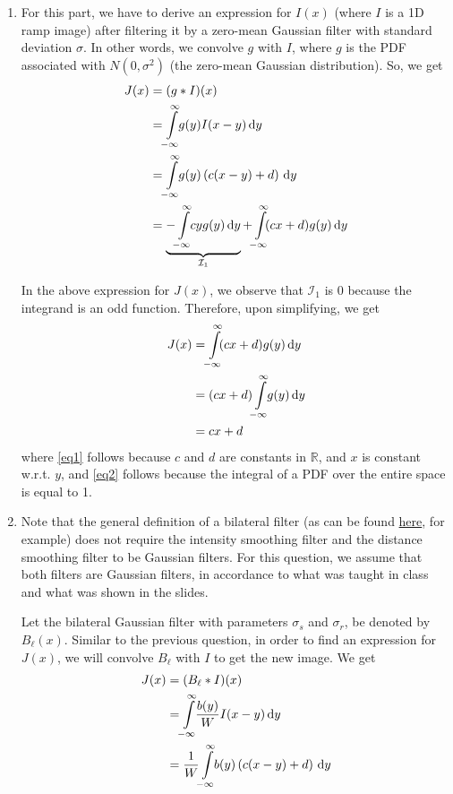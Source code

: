 \documentclass[a4paper]{article}
\newcommand{\R}{\mathbb{R}}
\begin{document}
\begin{enumerate}
\item For this part, we have to derive an expression for $I(x)$ (where $I$ is a 1D ramp image) after filtering it by a zero-mean Gaussian filter with standard deviation $\sigma$. In other words, we convolve $g$ with $I$, where $g$ is the PDF associated with $N(0, \sigma^2)$ (the zero-mean Gaussian distribution). So, we get
\begin{align*}
J(x) &= (g * I)(x) \\
&= \int\limits_{\mathclap{-\infty}}^{\mathclap{\infty}}\! g(y) I (x - y)\, \mathrm{d}y \\
&= \int\limits_{\mathclap{-\infty}}^{\mathclap{\infty}}\! g(y)\left ( c(x - y) + d\right )\, \mathrm{d}y \\
&= \underbrace{-\int\limits_{\mathclap{-\infty}}^{\mathclap{\infty}}\! c y g(y)\, \mathrm{d}y}_{\mathcal{I}_1} + \int\limits_{\mathclap{-\infty}}^{\mathclap{\infty}}\! (cx + d)g(y)\, \mathrm{d}y
\end{align*}

In the above expression for $J(x)$, we observe that $\mathcal{I}_1$ is 0 because the integrand is an odd function. Therefore, upon simplifying, we get
\begin{align}
J(x) &= \int\limits_{\mathclap{-\infty}}^{\mathclap{\infty}}\! (cx + d)g(y)\, \mathrm{d}y \nonumber \\
&=  (cx + d)\int\limits_{\mathclap{-\infty}}^{\mathclap{\infty}}\!g(y)\, \mathrm{d}y \label{eq1} \\
&= cx + d \label{eq2}
\end{align}
where \eqref{eq1} follows because $c$ and $d$ are constants in $\R$, and $x$ is constant w.r.t. $y$, and \eqref{eq2} follows because the integral of a PDF over the entire space is equal to 1.

\item Note that the general definition of a bilateral filter (as can be found \href{https://en.wikipedia.org/wiki/Bilateral_filter#Definition}{here}, for example) does not require the intensity smoothing filter and the distance smoothing filter to be Gaussian filters. For this question, we assume that both filters are Gaussian filters, in accordance to what was taught in class and what was shown in the slides.

Let the bilateral Gaussian filter with parameters $\sigma_s$ and $\sigma_r$, be denoted by $B_\ell(x)$. Similar to the previous question, in order to find an expression for $J(x)$, we will convolve $B_\ell$ with $I$ to get the new image. We get
\begin{align}
J(x) &= (B_\ell * I)(x) \nonumber \\
&= \int\limits_{\mathclap{-\infty}}^{\mathclap{\infty}}\! \dfrac{b(y)}{W} I (x - y)\, \mathrm{d}y \nonumber \\
&= \dfrac{1}{W}\int\limits_{\mathclap{-\infty}}^{\mathclap{\infty}}\! b(y)\left ( c(x - y) + d\right )\, \mathrm{d}y
\label{eq6}
\end{align}


\end{enumerate}
\end{document}
